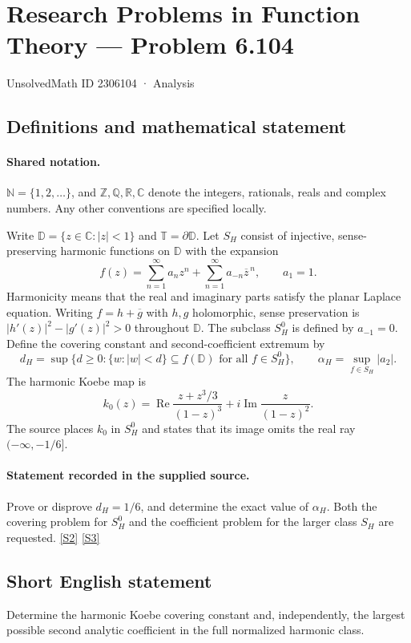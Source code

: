 \documentclass[11pt]{article}
\newcommand{\sref}[2]{\hyperlink{source:#1:#2}{[S#2]}}
\begin{document}
\setcounter{section}{2306103}
\section{Research Problems in Function Theory — Problem 6.104}\label{2306104}
{\small\sffamily UnsolvedMath ID 2306104 · Analysis}
\subsection{Definitions and mathematical statement}

\paragraph{Shared notation.}$\mathbb N=\{1,2,\ldots\}$, and $\mathbb Z,\mathbb Q,\mathbb R,\mathbb C$ denote the integers, rationals, reals and complex numbers. Any other conventions are specified locally.


Write $\mathbb D=\{z\in\mathbb C:|z|<1\}$ and $\mathbb T=\partial\mathbb D$. Let $S_H$ consist of injective, sense-preserving harmonic functions on $\mathbb D$ with the expansion
\[f(z)=\sum_{n=1}^{\infty}a_nz^n+\sum_{n=1}^{\infty}a_{-n}\overline z^{\,n},\qquad a_1=1.\]
Harmonicity means that the real and imaginary parts satisfy the planar Laplace equation. Writing $f=h+\overline g$ with $h,g$ holomorphic, sense preservation is $|h'(z)|^2-|g'(z)|^2>0$ throughout $\mathbb D$. The subclass $S_H^0$ is defined by $a_{-1}=0$.
Define the covering constant and second-coefficient extremum by
\[d_H=\sup\{d\geq0:\{w:|w|<d\}\subseteq f(\mathbb D)\text{ for all }f\in S_H^0\},
\qquad \alpha_H=\sup_{f\in S_H}|a_2|.\]
The harmonic Koebe map is
\[k_0(z)=\operatorname{Re}\frac{z+z^3/3}{(1-z)^3}
+i\operatorname{Im}\frac{z}{(1-z)^2}.\]
The source places $k_0$ in $S_H^0$ and states that its image omits the real ray $(-\infty,-1/6]$.
\paragraph{Statement recorded in the supplied source.}
Prove or disprove $d_H=1/6$, and determine the exact value of $\alpha_H$. Both the covering problem for $S_H^0$ and the coefficient problem for the larger class $S_H$ are requested. \sref{2306104}{2} \sref{2306104}{3}
\subsection{Short English statement}
Determine the harmonic Koebe covering constant and, independently, the largest possible second analytic coefficient in the full normalized harmonic class.
\end{document}
